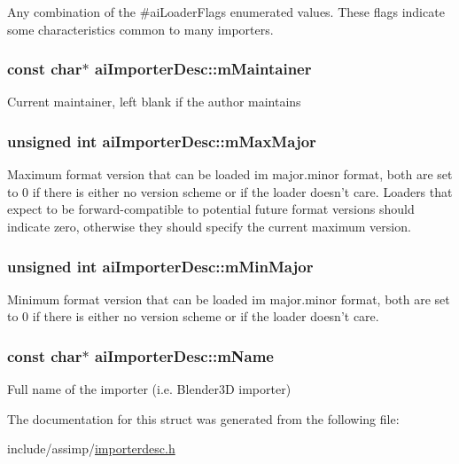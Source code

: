 \-Any combination of the \#ai\-Loader\-Flags enumerated values. \-These flags indicate some characteristics common to many importers. \hypertarget{structaiImporterDesc_a53bf0ecb36ce0b97018b4b6bd2748f02}{
\subsubsection[{m\-Maintainer}]{\setlength{\rightskip}{0pt plus 5cm}const char$\ast$ {\bf ai\-Importer\-Desc\-::m\-Maintainer}}}\label{structaiImporterDesc_a53bf0ecb36ce0b97018b4b6bd2748f02}
\-Current maintainer, left blank if the author maintains \hypertarget{structaiImporterDesc_a9d33eac3be20f7f4630f838a228ada63}{
\subsubsection[{m\-Max\-Major}]{\setlength{\rightskip}{0pt plus 5cm}unsigned int {\bf ai\-Importer\-Desc\-::m\-Max\-Major}}}\label{structaiImporterDesc_a9d33eac3be20f7f4630f838a228ada63}
\-Maximum format version that can be loaded im major.\-minor format, both are set to 0 if there is either no version scheme or if the loader doesn't care. \-Loaders that expect to be forward-\/compatible to potential future format versions should indicate zero, otherwise they should specify the current maximum version. \hypertarget{structaiImporterDesc_aee34d348f522807f0a36607664e92a57}{
\subsubsection[{m\-Min\-Major}]{\setlength{\rightskip}{0pt plus 5cm}unsigned int {\bf ai\-Importer\-Desc\-::m\-Min\-Major}}}\label{structaiImporterDesc_aee34d348f522807f0a36607664e92a57}
\-Minimum format version that can be loaded im major.\-minor format, both are set to 0 if there is either no version scheme or if the loader doesn't care. \hypertarget{structaiImporterDesc_a2a9d5fd818c01bba1a0a782722ab9495}{
\subsubsection[{m\-Name}]{\setlength{\rightskip}{0pt plus 5cm}const char$\ast$ {\bf ai\-Importer\-Desc\-::m\-Name}}}\label{structaiImporterDesc_a2a9d5fd818c01bba1a0a782722ab9495}
\-Full name of the importer (i.\-e. \-Blender3\-D importer) 

\-The documentation for this struct was generated from the following file\-:\begin{DoxyCompactItemize}
\item 
include/assimp/\hyperlink{importerdesc_8h}{importerdesc.\-h}\end{DoxyCompactItemize}
